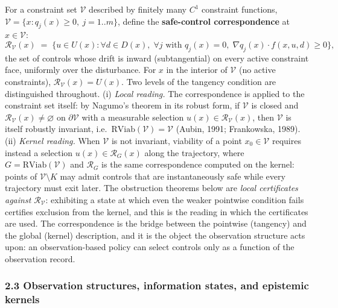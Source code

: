 \documentclass[11pt]{article}
\theoremstyle{definition}
\begin{document}
For a constraint set \(\mathcal{V}\) described by finitely many \(C^1\)
constraint functions,
\(\mathcal{V} = \{ x : q_j(x) \ge 0,\ j = 1..m \}\), define the
\textbf{safe-control correspondence} at \(x \in \mathcal{V}\):
\[\mathcal{R}_{\mathcal{V}}(x) \;=\; \Big\{ u \in U(x) : \forall d \in D(x),\; \forall j \text{ with } q_j(x) = 0,\; \nabla q_j(x) \cdot f(x, u, d) \ge 0 \Big\},\]
the set of controls whose drift is inward (subtangential) on every
active constraint face, uniformly over the disturbance. For \(x\) in the
interior of \(\mathcal{V}\) (no active constraints),
\(\mathcal{R}_{\mathcal{V}}(x) = U(x)\). Two levels of the tangency condition are distinguished throughout. (i) \emph{Local reading.} The correspondence is applied to the constraint set itself: by Nagumo's theorem in
its robust form, if \(\mathcal{V}\) is closed and
\(\mathcal{R}_{\mathcal{V}}(x) \neq \varnothing\) on
\(\partial\mathcal{V}\) with a measurable selection
\(u(x) \in \mathcal{R}_{\mathcal{V}}(x)\), then \(\mathcal{V}\) is
itself robustly invariant,
i.e.~\(\mathrm{RViab}(\mathcal{V}) = \mathcal{V}\) (Aubin, 1991;
Frankowska, 1989). (ii) \emph{Kernel reading.} When \(\mathcal{V}\) is not invariant, viability of a point \(x_0 \in \mathcal{V}\) requires instead a selection \(u(x) \in \mathcal{R}_G(x)\) along the trajectory, where \(G = \mathrm{RViab}(\mathcal{V})\) and \(\mathcal{R}_G\) is the same correspondence computed on the kernel: points of
\(\mathcal{V} \setminus K\) may admit controls that are instantaneously
safe while every trajectory must exit later. The obstruction
theorems below are \emph{local certificates against
\(\mathcal{R}_{\mathcal{V}}\)}: exhibiting a state at which even the
weaker pointwise condition fails certifies exclusion from the kernel,
and this is the reading in which the certificates are used. The
correspondence is the bridge between the pointwise (tangency) and the
global (kernel) description, and it is the object the observation
structure acts upon: an observation-based policy can select controls
only as a function of the observation record.

\subsubsection{2.3 Observation structures, information states, and
epistemic
kernels}\label{observation-structures-information-states-and-epistemic-kernels}
\end{document}
